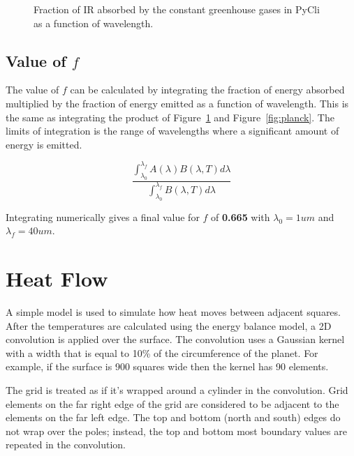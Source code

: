 \documentclass[12pt]{article} %
\begin{document}
\begin{figure}[H]
	\caption{Fraction of IR absorbed by the constant greenhouse gases in PyCli as a function of wavelength.}
	\label{fig:combine_absorb}
\end{figure}

\subsection{Value of $f$}
The value of $f$ can be calculated by integrating the fraction of energy absorbed multiplied by the fraction of energy emitted as a function of wavelength. This is the same as integrating the product of Figure~\ref{fig:combine_absorb} and Figure~\ref{fig:planck}. The limits of integration is the range of wavelengths where a significant amount of energy is emitted. 

$$\frac{\int_{\lambda_0}^{\lambda_f} A(\lambda) B(\lambda, T) d\lambda}{\int_{\lambda_0}^{\lambda_f} B(\lambda, T) d\lambda }$$

Integrating numerically gives a final value for $f$ of \textbf{0.665} with $\lambda_0 = 1um$ and $\lambda_f = 40 um$.

\newpage
\section{Heat Flow}
\label{sec:heatflow}

A simple model is used to simulate how heat moves between adjacent squares. After the temperatures are calculated using the energy balance model, a 2D convolution is applied over the surface. The convolution uses a Gaussian kernel with a width that is equal to 10\% of the circumference of the planet. For example, if the surface is 900 squares wide then the kernel has 90 elements.

The grid is treated as if it's wrapped around a cylinder in the convolution. Grid elements on the far right edge of the grid are considered to be adjacent to the elements on the far left edge. The top and bottom (north and south) edges do not wrap over the poles; instead, the top and bottom most boundary values are repeated in the convolution.
\end{document}
